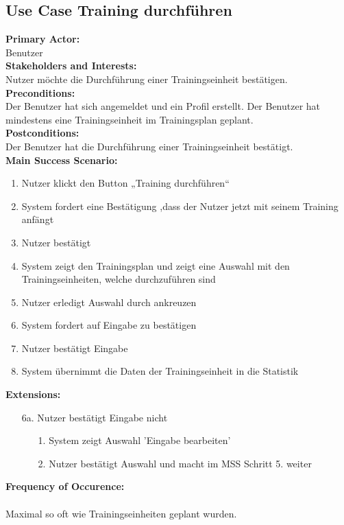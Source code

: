 \documentclass[12pt,a4paper,onecolumn]{article}
\begin{document}
\subsection{Use Case Training durchführen}
\textbf{Primary Actor:}\\ Benutzer\\
\textbf{Stakeholders and Interests:}\\
Nutzer möchte die Durchführung einer Trainingseinheit bestätigen.\\
\textbf{Preconditions:} \\  Der Benutzer hat sich angemeldet und ein Profil erstellt. Der Benutzer hat mindestens eine Trainingseinheit im Trainingsplan geplant. \\
\textbf{Postconditions:}\\Der Benutzer hat die Durchführung einer Trainingseinheit bestätigt.\\
\textbf{Main Success Scenario:}
\begin{enumerate}
    \item Nutzer klickt den Button „Training durchführen“
    \item System fordert eine Bestätigung ,dass der Nutzer jetzt mit seinem Training anfängt
    \item Nutzer bestätigt
    \item System zeigt den Trainingsplan und zeigt eine Auswahl mit den Trainingseinheiten, welche durchzuführen sind
    \item Nutzer erledigt Auswahl durch ankreuzen
    \item System fordert auf Eingabe zu bestätigen
    \item Nutzer bestätigt Eingabe
    \item System übernimmt die Daten der Trainingseinheit in die Statistik
\end{enumerate}
\textbf{Extensions:}
\begin{enumerate}
    \item [6a.]  Nutzer bestätigt Eingabe nicht
    \begin{enumerate}
        \item[1.]System zeigt Auswahl 'Eingabe bearbeiten'
        \item[2.]Nutzer bestätigt Auswahl und macht im MSS Schritt 5. weiter
    \end{enumerate}
\end{enumerate}
\textbf{Frequency of Occurence:}\\ \\
Maximal so oft wie Trainingseinheiten geplant wurden. 
\end{document}
